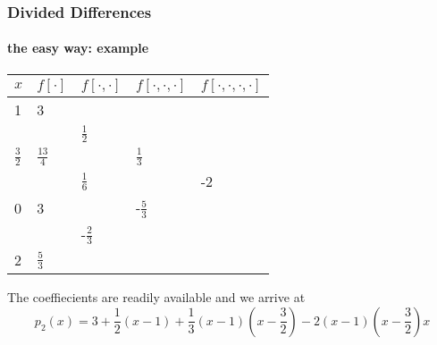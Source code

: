 \documentclass[10pt]{beamer}
\begin{document}
\begin{frame}
\frametitle{Divided Differences}
\framesubtitle{the easy way: example}
\begin{center}
\begin{tabular}{l | l | l | l | l}
$x$              & $f[\cdot]$       & $f[\cdot,\cdot]$            & $f[\cdot,\cdot,\cdot]$ & $f[\cdot,\cdot,\cdot,\cdot]$\\\hline
{1}              & {\color{red}3}   &                             &                        &                      \\
                 &                  & {\color{red}$\frac{1}{2}$}  &                        &                      \\
{$\frac{3}{2}$}  & {$\frac{13}{4}$} &                             & {\color{red}$\frac{1}{3}$} &                      \\ 
                 &                  & {           $\frac{1}{6}$}  &                  &{\color{red}-2} \\
{0}              & {3}              &                             & {           -$\frac{5}{3}$} &                      \\
                 &                  & {           -$\frac{2}{3}$} &                        &                      \\
{2}              & {$\frac{5}{3}$}  &                             &                        &                      \\
\end{tabular}
\end{center}
The coeffiecients are readily available and we arrive at
\begin{equation*}
  p_2(x) = 3 + \frac{1}{2}(x-1) + \frac{1}{3}(x-1)(x-\frac{3}{2}) -
2(x-1)(x-\frac{3}{2})x
\end{equation*}

\end{frame}
\end{document}

